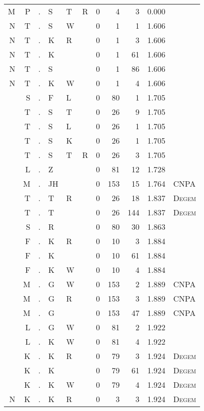 \begin{longtable}{r@{ } r@{ } c@{ } l@{ } l@{ } l@{ } r r r r l }
M & P & . & S & T & R & 0 & 4 & 3 & 0.000 &  \\
N & T & . & S & W &   & 0 & 1 & 1 & 1.606 &  \\
N & T & . & K & R &   & 0 & 1 & 3 & 1.606 &  \\
N & T & . & K &   &   & 0 & 1 & 61 & 1.606 &  \\
N & T & . & S &   &   & 0 & 1 & 86 & 1.606 &  \\
N & T & . & K & W &   & 0 & 1 & 4 & 1.606 &  \\
  & S & . & F & L &   & 0 & 80 & 1 & 1.705 &  \\
  & T & . & S & T &   & 0 & 26 & 9 & 1.705 &  \\
  & T & . & S & L &   & 0 & 26 & 1 & 1.705 &  \\
  & T & . & S & K &   & 0 & 26 & 1 & 1.705 &  \\
  & T & . & S & T & R & 0 & 26 & 3 & 1.705 &  \\
  & L & . & Z &   &   & 0 & 81 & 12 & 1.728 &  \\
  & M & . & JH &   &   & 0 & 153 & 15 & 1.764 & \textsc{CNPA} \\
  & T & . & T & R &   & 0 & 26 & 18 & 1.837 & \textsc{Degem} \\
  & T & . & T &   &   & 0 & 26 & 144 & 1.837 & \textsc{Degem} \\
  & S & . & R &   &   & 0 & 80 & 30 & 1.863 &  \\
  & F & . & K & R &   & 0 & 10 & 3 & 1.884 &  \\
  & F & . & K &   &   & 0 & 10 & 61 & 1.884 &  \\
  & F & . & K & W &   & 0 & 10 & 4 & 1.884 &  \\
  & M & . & G & W &   & 0 & 153 & 2 & 1.889 & \textsc{CNPA} \\
  & M & . & G & R &   & 0 & 153 & 3 & 1.889 & \textsc{CNPA} \\
  & M & . & G &   &   & 0 & 153 & 47 & 1.889 & \textsc{CNPA} \\
  & L & . & G & W &   & 0 & 81 & 2 & 1.922 &  \\
  & L & . & K & W &   & 0 & 81 & 4 & 1.922 &  \\
  & K & . & K & R &   & 0 & 79 & 3 & 1.924 & \textsc{Degem} \\
  & K & . & K &   &   & 0 & 79 & 61 & 1.924 & \textsc{Degem} \\
  & K & . & K & W &   & 0 & 79 & 4 & 1.924 & \textsc{Degem} \\
N & K & . & K & R &   & 0 & 3 & 3 & 1.924 & \textsc{Degem} \\

\end{longtable}
